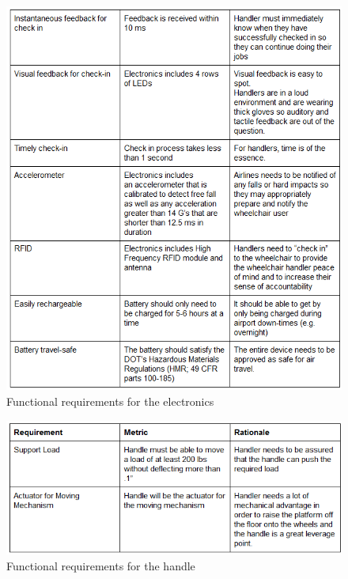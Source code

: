 \newpage

\begin{figure}[h!]
  \centering
     \includegraphics[scale=1]{images/functional_requirements_electronics.png}
   \caption{Functional requirements for the electronics}
  \label{fig:fun_req_electronics}
\end{figure}

\newpage

\begin{figure}[h!]
  \centering
     \includegraphics[scale=1]{images/functional_requirements_handle.png}
   \caption{Functional requirements for the handle}
  \label{fig:fun_req_handle}
\end{figure}

